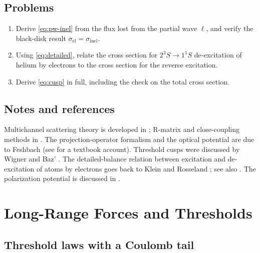 \documentclass[11pt,a4paper]{book}
\numberwithin{equation}{chapter}
\begin{document}
\section{Problems}
\begin{enumerate}
  \item Derive \eqref{eq:pw-inel} from the flux lost from the partial wave
        $\ell$, and verify the black-disk result $\sigma_{\mathrm{el}}=\sigma_{\mathrm{inel}}$.
  \item Using \eqref{eq:detailed}, relate the cross section for $2^3S\to1^1S$
        de-excitation of helium by electrons to the cross section for the
        reverse excitation.
  \item Derive \eqref{eq:cusp} in full, including the check on the total cross
        section.
\end{enumerate}

\section*{Notes and references}
Multichannel scattering theory is developed in \cite{Newton,Taylor,GW,Messiah}; R-matrix and close-coupling methods in \cite{Burke}. The projection-operator formalism and the optical potential are due to Feshbach \cite{Feshbach58} (see \cite{Feshbach92} for a textbook account). Threshold cusps were discussed by Wigner \cite{Wigner48} and Baz' \cite{Baz57}. The detailed-balance relation between excitation and de-excitation of atoms by electrons goes back to Klein and Rosseland \cite{KleinRosseland}; see also \cite{LL3,MM}. The polarization potential is discussed in \cite{MM,BJ}.

\chapter{Long-Range Forces and Thresholds}

\section{Threshold laws with a Coulomb tail}\label{sec:thr-coulomb}
\end{document}
